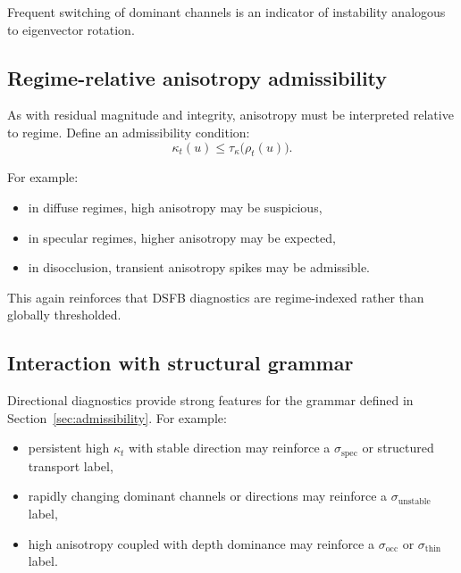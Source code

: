 \documentclass[11pt,letterpaper]{article}
\theoremstyle{gcresult}
\theoremstyle{definition}
\begin{document}
Frequent switching of dominant channels is an indicator of instability analogous to eigenvector rotation.


\subsection{Regime-relative anisotropy admissibility}

As with residual magnitude and integrity, anisotropy must be interpreted relative to regime. Define an admissibility condition:
\begin{equation}
\kappa_t(u)\le \tau_\kappa\bigl(\rho_t(u)\bigr).
\end{equation}

For example:
\begin{itemize}[leftmargin=1.5em]
    \item in diffuse regimes, high anisotropy may be suspicious,
    \item in specular regimes, higher anisotropy may be expected,
    \item in disocclusion, transient anisotropy spikes may be admissible.
\end{itemize}

This again reinforces that DSFB diagnostics are regime-indexed rather than globally thresholded.


\subsection{Interaction with structural grammar}

Directional diagnostics provide strong features for the grammar defined in Section~\ref{sec:admissibility}. For example:

\begin{itemize}[leftmargin=1.5em]
    \item persistent high $\kappa_t$ with stable direction may reinforce a $\sigma_{\mathrm{spec}}$ or structured transport label,
    \item rapidly changing dominant channels or directions may reinforce a $\sigma_{\mathrm{unstable}}$ label,
    \item high anisotropy coupled with depth dominance may reinforce a $\sigma_{\mathrm{occ}}$ or $\sigma_{\mathrm{thin}}$ label.
\end{itemize}
\end{document}
